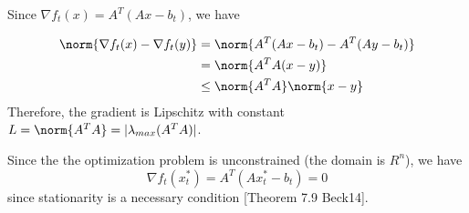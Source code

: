 \documentclass{homework}
\begin{document}
\begin{letterenum}

    \item Since $\nabla f_t(x) = A^T(Ax - b_t)$, we have

    \begin{align*}
        \norm{\nabla f_t (x) - \nabla f_t(y)} &= 
           \norm{A^T(Ax - b_t) - A^T(Ay - b_t)} \\
           &= \norm{A^TA (x - y)} \\
           &\leq \norm{A^TA} \norm{x - y}
    \end{align*}
    Therefore, the gradient is Lipschitz with constant
    $L=\norm{A^TA}=|\lambda_{max}(A^TA)|$.




    \item Since the the optimization problem is unconstrained (the domain is $R^n$),
        we have
        \begin{equation}
            \nabla f_t(x_t^*) = A^T (A x_t^* - b_t) = 0
            \label{eq:stationarity}
        \end{equation}
        since stationarity is a necessary condition [Theorem 7.9 Beck14].
    

\end{letterenum}
\end{document}

